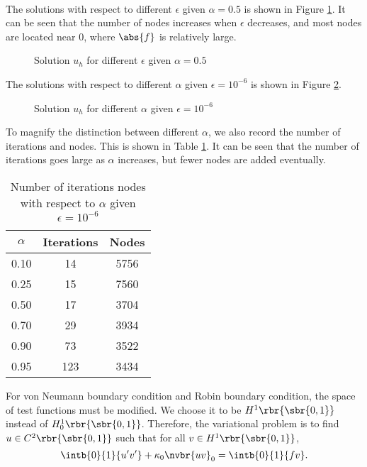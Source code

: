 \documentclass[english, nochinese]{pkupaper}
\begin{document}
\begin{thmquestion}
\ 
\begin{thmanswer}
The solutions with respect to different $\epsilon$ given $ \alpha = 0.5 $ is shown in Figure \ref{Fig:Ques51}. It can be seen that the number of nodes increases when $\epsilon$ decreases, and most nodes are located near $0$, where $\abs{f}$ is relatively large.

\begin{figure}[htbp]
\centering
\scalebox{0.75}{}
\caption{Solution $u_h$ for different $\epsilon$ given $ \alpha = 0.5 $}
\label{Fig:Ques51}
\end{figure}

The solutions with respect to different $\alpha$ given $ \epsilon = 10^{-6} $ is shown in Figure \ref{Fig:Ques52}.

\begin{figure}[htbp]
\centering
\scalebox{0.75}{}
\caption{Solution $u_h$ for different $\alpha$ given $ \epsilon = 10^{-6} $}
\label{Fig:Ques52}
\end{figure}

To magnify the distinction between different $\alpha$, we also record the number of iterations and nodes. This is shown in Table \ref{Tbl:Nodes}. It can be seen that the number of iterations goes large as $\alpha$ increases, but fewer nodes are added eventually.

\begin{table}[htbp]
\centering
\caption{Number of iterations nodes with respect to $\alpha$ given $ \epsilon = 10^{-6} $}
\label{Tbl:Nodes}
\begin{tabular}{|c|c|c|}
\hline
$\alpha$ & Iterations & Nodes \\
\hline
0.10 & 14 & 5756 \\
\hline
0.25 & 15 & 7560 \\
\hline
0.50 & 17 & 3704 \\
\hline
0.70 & 29 & 3934 \\
\hline
0.90 & 73 & 3522 \\
\hline
0.95 & 123 & 3434 \\
\hline
\end{tabular}
\end{table}

For von Neumann boundary condition and Robin boundary condition, the space of test functions must be modified. We choose it to be $ H^1 \rbr{\sbr{ 0, 1 }} $ instead of $ H_0^1 \rbr{\sbr{ 0, 1 }} $. Therefore, the variational problem is to find $ u \in C^2 \rbr{\sbr{ 0, 1 }} $ such that for all $ v \in H^1 \rbr{\sbr{ 0, 1 }} $,
\begin{equation}
\intb{0}{1}{ u' v' } + \kappa_0 \nvbr{ u v }_0 = \intb{0}{1}{ f v }.
\end{equation}


\end{thmanswer}
\end{thmquestion}
\end{document}
